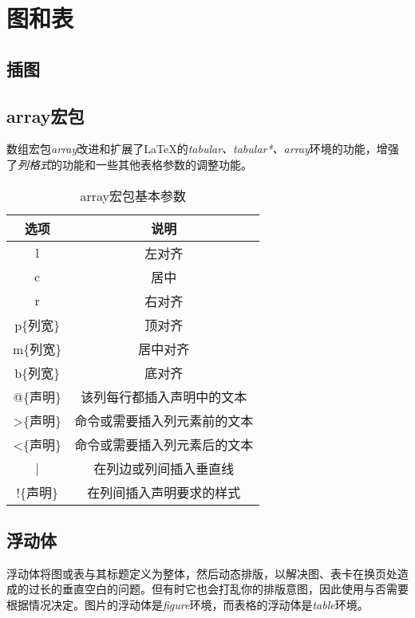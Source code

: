 {\let\clearpage\relax \chapter{图和表}}

\section{插图}

\section{array宏包}

数组宏包\emph{array}改进和扩展了\LaTeX 的\emph{tabular、tabular*、array}环境的功能，增强了\emph{列格式}的功能和一些其他表格参数的调整功能。

\begin{table}[!ht]
    \caption{array宏包基本参数}
    \begin{center}
    \begin{tabular}{|c|c|}
    \hline 
    选项    &    说明 \\ 
    \hline
    l    &    左对齐 \\ 
    \hline
    c    &    居中 \\ 
    \hline
    r    &    右对齐 \\ 
    \hline
    p\{列宽\}    &    顶对齐 \\ 
    \hline
    m\{列宽\}    &    居中对齐 \\ 
    \hline
    b\{列宽\}    &    底对齐 \\ 
    \hline
    @\{声明\}    &    该列每行都插入声明中的文本 \\ 
    \hline
    >\{声明\}    &    命令或需要插入列元素前的文本 \\ 
    \hline
    <\{声明\}    &    命令或需要插入列元素后的文本 \\ 
    \hline
    |    &    在列边或列间插入垂直线 \\ 
    \hline
    !\{声明\}    &    在列间插入声明要求的样式 \\ 
    \hline
    \end{tabular}
\end{center}
\end{table}

\section{浮动体}

浮动体将图或表与其标题定义为整体，然后动态排版，以解决图、表卡在换页处造成的过长的垂直空白的问题。但有时它也会打乱你的排版意图，因此使用与否需要根据情况决定。图片的浮动体是\emph{figure}环境，而表格的浮动体是\emph{table}环境。


